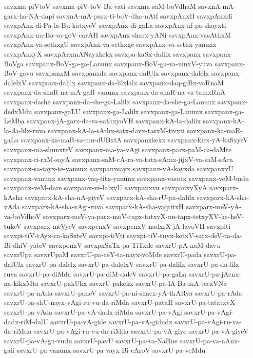 {savxma-piVtoV
savxma-piV-toV-Ba-vati
savxma-saM-boVdhaM
savxnA-mA-garx-ha-NA-dapi
savxnA-mA-parx-ti-boV-dha-nAtf
savxpAnxH
savxpAnxdi
savxpAnx-di-Pa-la-Bu-katxyeV
savxpAnx-di-gaLa
savxpAnx-nf-pa-shayxti
savxpAnx-nu-Ba-va-goV-carAH
savxpAnx-sharx-yANi
savxpAnx-vasAthxM
savxpAnx-va-sethxgU
savxpAnx-va-sethxge
savxpAnx-va-sethx-yanunx
savxpAnxyX
savxpArxmANayxkekx
savxpa-kaSx-dalilx
savxpanx
savxpanx-BoVga
savxpanx-BoV-ga-ga-Lanunx
savxpanx-BoV-ga-va-ninxV-yuva
savxpanx-BoV-gavu
savxpanxM
savxpanxda
savxpanx-dalUlx
savxpanx-dalelx
savxpanx-dalelxV
savxpanx-dalilx
savxpanx-da-lilxlalx
savxpanx-daq-giBx-vaRnaM
savxpanx-da-shaR-na-mA-gaR-vanunx
savxpanx-da-shaR-na-va-tamxRnA
savxpanx-dashe
savxpanx-da-she-ga-Lalilx
savxpanx-da-she-ga-Lanunx
savxpanx-dedxMdu
savxpanx-gaLU
savxpanx-ga-Lalilx
savxpanx-ga-Lanunx
savxpanx-ga-LeMba
savxpanx-jA-garx-da-va-sathxyoVH
savxpanx-kA-la-dalilx
savxpanx-kA-la-da-lilx-ruva
savxpanx-kA-la-sAthx-satx-davx-tasxM-tivxti
savxpanx-ka-maR-gaLu
savxpanx-ka-maR-sa-mu-dUBxtA
savxpanxkekx
savxpanx-kirx-yA-kaSxyeV
savxpanx-ma-shunxteV
savxpanx-ma-ya-vAgi
savxpanx-parx-paM-ca-daMte
savxpanx-ri-raM-sayA
savxpanx-saM-cA-ra-va-tatx-sAmx-jijxV-va-saM-sAra
savxpanx-sa-tayx-te-yanunx
savxpanxsayx
savxpanx-vA-kayxda
savxpanxvU
savxpanx-vanunx
savxpanx-vaq-titx-yanunx
savxpanx-vasutx
savxpanx-veM-budu
savxpanx-veM-dare
savxpanx-ve-lalxvU
savxpanxvu
savxpanxyXyA
savxparx-kAsha
savxparx-kA-sha-nA-giyeV
savxparx-kA-sha-rU-pa-dalilx
savxparx-kA-sha-vAda
savxparx-kA-sha-vAgi-ruva
savxparx-kA-sha-vaqtitxH
savxparx-meV-yA-va-boVdhoV
savxparx-meV-ya-parx-moV-tapx-tatxyX-nu-tapx-tetxyXV-ka-heV-tukeV
savxparx-meVyeV
savxpenxV
savxpenxV-nadxrX-jA-layoVH
savxpiti
savxpi-tiV-tAyx-ca-kaSxteV
savxpi-tiVti
savxpi-tiV-tuyx-ketxV-satx-deV-ta-da-Bi-dhiV-yateV
savxponxV
savxpxSaTx-pa-TiTxde
savxrU-pA-naM-davu
savxrUpa
savxrUpaM
savxrU-pa-ceY-ta-nayx-voMde
savxrU-pada
savxrU-pa-dalUlx
savxrU-pa-dalelx
savxrU-pa-dalelxV
savxrU-pa-dalilx
savxrU-pa-da-lilx-ruva
savxrU-pa-diMda
savxrU-pa-diM-daleV
savxrU-pa-gaLa
savxrU-pa-jAcnx-na-kikxMta
savxrU-pakUkx
savxrU-pakekx
savxrU-pa-lA-Ba-mA-terxVNa
savxrU-pa-nAda
savxrU-paneV
savxrU-pa-ni-shacx-yA-thARya
savxrU-pa-rAda
savxrU-pa-shU-nayx-vAgi-ru-vu-da-riMda
savxrU-pataH
savxrU-pa-tatatxvX
savxrU-pa-vAda
savxrU-pa-vA-dadx-riMda
savxrU-pa-vAgi
savxrU-pa-vAgi-dadx-riM-dalU
savxrU-pa-vA-gide
savxrU-pa-vA-gidudx
savxrU-pa-vAgi-ru-va-da-riMda
savxrU-pa-vAgi-ru-vu-da-riMda
savxrU-pa-vA-giye
savxrU-pa-vA-giyeV
savxrU-pa-vA-gu-vudu
savxrU-pavU
savxrU-pa-va-NaRne
savxrU-pa-va-nAnx-gali
savxrU-pa-vanunx
savxrU-pa-vayx-Bi-cAroV
savxrU-pa-veMdu
}
